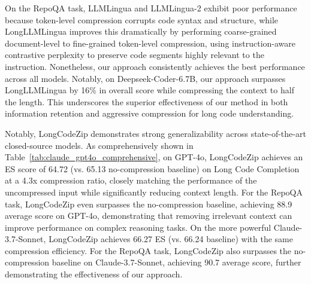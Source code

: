 \documentclass[10pt,conference]{IEEEtran}
\newcommand{\edit}[1]{{\color{black}#1}}
\newcommand{\todoc}[2]{{\textcolor{#1}{\textbf{[#2]}}}}
\newcommand{\shi}[1]{\todoc{orange}{Shi: #1}}
\newcommand{\approach}{{LongCodeZip}\xspace} %
\begin{document}
On the RepoQA task, LLMLingua and LLMLingua-2 exhibit poor performance because token-level compression corrupts code syntax and structure, while LongLLMLingua improves this dramatically by performing coarse-grained document-level to fine-grained token-level compression, using instruction-aware contrastive perplexity to preserve code segments highly relevant to the instruction. Nonetheless, our approach consistently achieves the best performance across all models. Notably, on Deepseek-Coder-6.7B, our approach surpasses LongLLMLingua by 16\% in overall score while compressing the context to half the length. This underscores the superior effectiveness of our method in both information retention and aggressive compression for long code understanding.

\edit{Notably, \approach demonstrates strong generalizability across state-of-the-art closed-source models. As comprehensively shown in Table~\ref{tab:claude_gpt4o_comprehensive}, on GPT-4o, \approach achieves an ES score of 64.72 (vs. 65.13 no-compression baseline) on Long Code Completion at a 4.3x compression ratio, closely matching the performance of the uncompressed input while significantly reducing context length. For the RepoQA task, \approach even surpasses the no-compression baseline, achieving 88.9 average score on GPT-4o, demonstrating that removing irrelevant context can improve performance on complex reasoning tasks. On the more powerful Claude-3.7-Sonnet, \approach achieves 66.27 ES (vs. 66.24 baseline) with the same compression efficiency. For the RepoQA task, \approach also surpasses the no-compression baseline on Claude-3.7-Sonnet, achieving 90.7 average score, further demonstrating the effectiveness of our approach.} 
\end{document}
